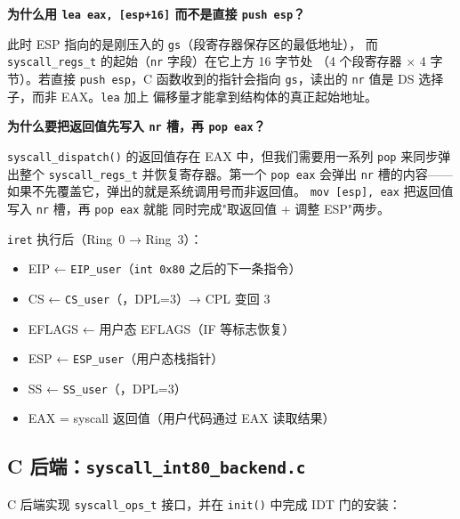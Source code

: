 \begin{whybox}
\textbf{为什么用 \texttt{lea eax, [esp+16]} 而不是直接 \texttt{push esp}？}

此时 ESP 指向的是刚压入的 \texttt{gs}（段寄存器保存区的最低地址），
而 \texttt{syscall\_regs\_t} 的起始（\texttt{nr} 字段）在它上方 16 字节处
（4 个段寄存器 × 4 字节）。若直接 \texttt{push esp}，C 函数收到的指针会指向
\texttt{gs}，读出的 \texttt{nr} 值是 DS 选择子，而非 EAX。\texttt{lea} 加上
偏移量才能拿到结构体的真正起始地址。
\end{whybox}

\begin{whybox}
\textbf{为什么要把返回值先写入 \texttt{nr} 槽，再 \texttt{pop eax}？}

\texttt{syscall\_dispatch()} 的返回值存在 EAX 中，但我们需要用一系列 \texttt{pop}
来同步弹出整个 \texttt{syscall\_regs\_t} 并恢复寄存器。第一个 \texttt{pop eax}
会弹出 \texttt{nr} 槽的内容——如果不先覆盖它，弹出的就是系统调用号而非返回值。
\texttt{mov [esp], eax} 把返回值写入 \texttt{nr} 槽，再 \texttt{pop eax} 就能
同时完成"取返回值 + 调整 ESP"两步。
\end{whybox}

\begin{cpustate}
\texttt{iret} 执行后（Ring~0 → Ring~3）：
\begin{itemize}
  \item EIP ← \texttt{EIP\_user}（\texttt{int 0x80} 之后的下一条指令）
  \item CS ← \texttt{CS\_user}（，DPL=3）→ CPL 变回 3
  \item EFLAGS ← 用户态 EFLAGS（IF 等标志恢复）
  \item ESP ← \texttt{ESP\_user}（用户态栈指针）
  \item SS ← \texttt{SS\_user}（，DPL=3）
  \item EAX = syscall 返回值（用户代码通过 EAX 读取结果）
\end{itemize}
\end{cpustate}

\subsection{C 后端：\texttt{syscall\_int80\_backend.c}}
\label{sec:int80-c-backend}

C 后端实现 \texttt{syscall\_ops\_t} 接口，并在 \texttt{init()} 中完成 IDT
门的安装：

